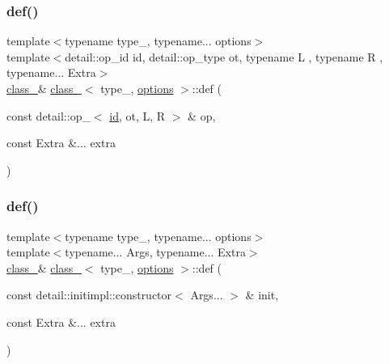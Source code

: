 \mbox{\label{classclass___a33f32e20792b94c7dd2b6c8440d15050}} 
\subsubsection{\texorpdfstring{def()}{def()}\hspace{0.1cm}{\footnotesize\ttfamily [2/6]}}
{\footnotesize\ttfamily template$<$typename type\+\_\+, typename... options$>$ \\
template$<$detail\+::op\+\_\+id id, detail\+::op\+\_\+type ot, typename L , typename R , typename... Extra$>$ \\
\mbox{\hyperlink{classclass__}{class\+\_\+}}\& \mbox{\hyperlink{classclass__}{class\+\_\+}}$<$ type\+\_\+, \mbox{\hyperlink{classoptions}{options}} $>$\+::def (\begin{DoxyParamCaption}\item[{const detail\+::op\+\_\+$<$ \mbox{\hyperlink{_s_d_l__opengl__glext_8h_a58c2a664503e14ffb8f21012aabff3e9}{id}}, ot, L, R $>$ \&}]{op,  }\item[{const Extra \&...}]{extra }\end{DoxyParamCaption})\hspace{0.3cm}{\ttfamily [inline]}}

\mbox{\label{classclass___a8b6307ed7817398318d1cc1609f69adf}} 
\subsubsection{\texorpdfstring{def()}{def()}\hspace{0.1cm}{\footnotesize\ttfamily [3/6]}}
{\footnotesize\ttfamily template$<$typename type\+\_\+, typename... options$>$ \\
template$<$typename... Args, typename... Extra$>$ \\
\mbox{\hyperlink{classclass__}{class\+\_\+}}\& \mbox{\hyperlink{classclass__}{class\+\_\+}}$<$ type\+\_\+, \mbox{\hyperlink{classoptions}{options}} $>$\+::def (\begin{DoxyParamCaption}\item[{const detail\+::initimpl\+::constructor$<$ Args... $>$ \&}]{init,  }\item[{const Extra \&...}]{extra }\end{DoxyParamCaption})\hspace{0.3cm}{\ttfamily [inline]}}

